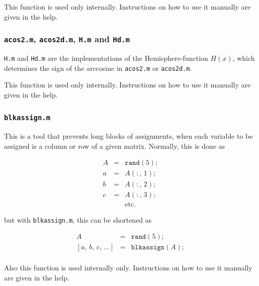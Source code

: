 \documentclass{report}
\begin{document}
This function is used only internally. Instructions on how to use
it manually are given in the help.

\subsubsection{\texttt{acos2.m}, \texttt{acos2d.m}, \texttt{H.m} and \texttt{Hd.m}}
\texttt{H.m} and \texttt{Hd.m} are the implementations of the
Hemisphere-function $H(x)$, which determines the sign of the
arccosine in \texttt{acos2.m} or \texttt{acos2d.m}.

This function is used only internally. Instructions on how to use
it manually are given in the help.

\subsubsection{\texttt{blkassign.m}}
This is a tool that prevents long blocks of assignments, when each
variable to be assigned is a column or row of a given matrix.
Normally, this is done as

\begin{eqnarray*}
    A &=& \texttt{rand}(5);\\
    a &=& A(:,\,1);\\
    b &=& A(:,\,2);\\
    c &=& A(:,\,3);\\
    &&\text{etc.}
\end{eqnarray*}

but with \texttt{blkassign.m}, this can be shortened as

\begin{eqnarray*}
    A &=& \texttt{rand}(5);\\
    \left[a,\,b,\,c,\,\dots\right] &=& \texttt{blkassign}(A);\\
\end{eqnarray*}

Also this function is used internally only. Instructions on how to
use it manually are given in the help.



\end{document}
